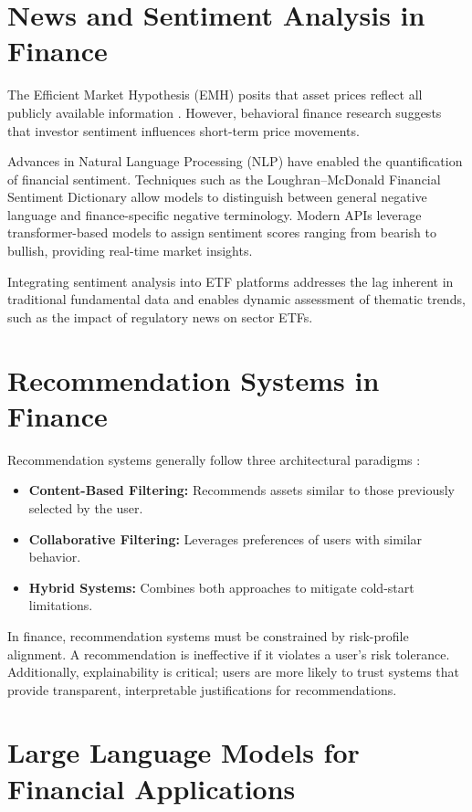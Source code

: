 \section{News and Sentiment Analysis in Finance}

The Efficient Market Hypothesis (EMH) posits that asset prices reflect all publicly available information \cite{fama1970}. However, behavioral finance research suggests that investor sentiment influences short-term price movements.

Advances in Natural Language Processing (NLP) have enabled the quantification of financial sentiment. Techniques such as the Loughran--McDonald Financial Sentiment Dictionary \cite{loughran2011} allow models to distinguish between general negative language and finance-specific negative terminology. Modern APIs leverage transformer-based models to assign sentiment scores ranging from bearish to bullish, providing real-time market insights.

Integrating sentiment analysis into ETF platforms addresses the lag inherent in traditional fundamental data and enables dynamic assessment of thematic trends, such as the impact of regulatory news on sector ETFs.

\section{Recommendation Systems in Finance}

Recommendation systems generally follow three architectural paradigms \cite{ricci2015}:

\begin{itemize}
    \item \textbf{Content-Based Filtering:} Recommends assets similar to those previously selected by the user.
    \item \textbf{Collaborative Filtering:} Leverages preferences of users with similar behavior.
    \item \textbf{Hybrid Systems:} Combines both approaches to mitigate cold-start limitations.
\end{itemize}

In finance, recommendation systems must be constrained by risk-profile alignment. A recommendation is ineffective if it violates a user’s risk tolerance. Additionally, explainability is critical; users are more likely to trust systems that provide transparent, interpretable justifications for recommendations.

\section{Large Language Models for Financial Applications}

